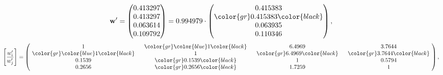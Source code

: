 \begin{example}
\begin{equation*}
\mathbf{w}^{\prime} =
\begin{pmatrix}
0.413297\\
0.413297\\
0.063614\\
0.109792
\end{pmatrix} =
0.994979\cdot
\begin{pmatrix}
0.415383\\
\color{gr} 0.415383\color{black} \\
0.063935\\
0.110346
\end{pmatrix},
\end{equation*}
\begin{equation*}
\left[ \frac{{w}^{\prime}_i}{{w}^{\prime}_j} \right] =
\begin{pmatrix}
$\,\,$ 1 $\,\,$ & $\,\,$\color{gr} \color{blue} 1\color{black} $\,\,$ & $\,\,$6.4969$\,\,$ & $\,\,$3.7644$\,\,$ \\
$\,\,$\color{gr} \color{blue} 1\color{black} $\,\,$ & $\,\,$ 1 $\,\,$ & $\,\,$\color{gr} 6.4969\color{black} $\,\,$ & $\,\,$\color{gr} 3.7644\color{black}   $\,\,$ \\
$\,\,$0.1539$\,\,$ & $\,\,$\color{gr} 0.1539\color{black} $\,\,$ & $\,\,$ 1 $\,\,$ & $\,\,$0.5794 $\,\,$ \\
$\,\,$0.2656$\,\,$ & $\,\,$\color{gr} 0.2656\color{black} $\,\,$ & $\,\,$1.7259$\,\,$ & $\,\,$ 1  $\,\,$ \\
\end{pmatrix},
\end{equation*}
\end{example}
\newpage
